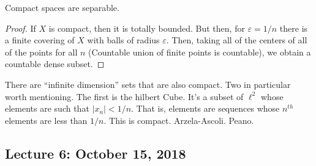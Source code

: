 \documentclass[crop=false,class=article,oneside]{standalone}
\begin{document}
                \begin{theorem}
                    Compact spaces are separable.
                \end{theorem}
                \begin{proof}
                    If $X$ is compact, then
                    it is totally bounded. But
                    then, for $\varepsilon=1/n$
                    there is a finite covering of
                    $X$ with balls of radius
                    $\varepsilon$. Then,
                    taking all of the
                    centers of all of the points
                    for all $n$ (Countable union
                    of finite points is countable),
                    we obtain a countable dense
                    subset.
                \end{proof}
                \begin{example}
                    There are ``infinite dimension''
                    sets that are also compact. Two
                    in particular worth mentioning.
                    The first is the hilbert Cube.
                    It's a subset of $\ell^{2}$
                    whose elements are such that
                    $|x_{n}|<1/n$. That is, elements
                    are sequences whose $n^{th}$
                    elements are less than
                    $1/n$. This is compact.
                    Arzela-Ascoli. Peano.
                \end{example}
    \subsection{Lecture 6: October 15, 2018}
\end{document}
